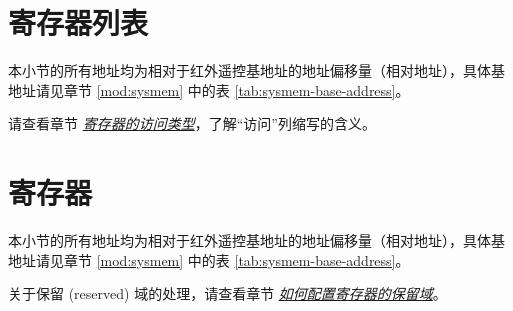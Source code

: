\documentclass[main\_\_CN.tex]{subfiles}
\begin{document}


\newpage
\hypertarget{rmt-reg-summ}{}

\section{寄存器列表}
\label{sec:rmt-reg-summ}

本小节的所有地址均为相对于红外遥控基地址的地址偏移量（相对地址），具体基地址请见章节 \ref{mod:sysmem} \textit{} 中的表 \ref{tab:sysmem-base-address}。

请查看章节 \hyperref[glossary-access-types]{\textit{寄存器的访问类型}}，了解“访问”列缩写的含义。






\newpage
\section{寄存器}

本小节的所有地址均为相对于红外遥控基地址的地址偏移量（相对地址），具体基地址请见章节 \ref{mod:sysmem} \textit{} 中的表 \ref{tab:sysmem-base-address}。

关于保留 (reserved) 域的处理，请查看章节 \hyperref[programming-reserved-field]{\textit{如何配置寄存器的保留域}}。


\end{document}
